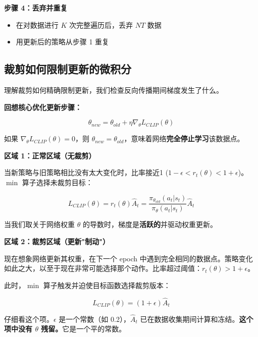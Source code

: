 \documentclass[12pt,a4paper]{article}
\theoremstyle{noteplain}
\theoremstyle{noteexercise}
\begin{document}
\textbf{步骤 4：丢弃并重复}
\begin{itemize}
  \setlength{\itemsep}{0.2em}
  \item 在对数据进行 $K$ 次完整遍历后，丢弃 $NT$ 数据
  \item 用更新后的策略从步骤 1 重复
\end{itemize}

\subsection{裁剪如何限制更新的微积分}

理解裁剪如何精确限制更新，我们检查反向传播期间梯度发生了什么。

\textbf{回想核心优化更新步骤：}

\begin{equation}\label{eq:update-step-2}
  \theta_{new} = \theta_{old} + \eta \nabla_\theta L_{CLIP}(\theta)
\end{equation}

如果 $\nabla_\theta L_{CLIP}(\theta) = 0$，则 $\theta_{new} = \theta_{old}$，意味着网络\textbf{完全停止学习}该数据点。

\textbf{区域 1：正常区域（无裁剪）}

当新策略与旧策略相比没有太大变化时，比率接近1 ($1-\epsilon < r_t(\theta) < 1+\epsilon$)。$\min$ 算子选择未裁剪目标：

\begin{equation}\label{eq:normal-zone}
  L_{CLIP}(\theta) = r_t(\theta) \hat{A}_t = \frac{\pi_{\theta_{old}}(a_t|s_t)}{\pi_\theta(a_t|s_t)} \hat{A}_t
\end{equation}

当我们取关于网络权重 $\theta$ 的导数时，梯度是\textbf{活跃的}并驱动权重更新。

\textbf{区域 2：裁剪区域（更新"制动"）}

现在想象网络更新其权重，在下一个 epoch 中遇到完全相同的数据点。策略变化如此之大，以至于现在非常可能选择那个动作。比率超过阈值：$r_t(\theta) > 1+\epsilon$。

此时，$\min$ 算子触发并迫使目标函数选择裁剪版本：

\begin{equation}\label{eq:clipped-zone}
  L_{CLIP}(\theta) = (1+\epsilon) \hat{A}_t
\end{equation}

仔细看这个项。$\epsilon$ 是一个常数（如 0.2），$\hat{A}_t$ 已在数据收集期间计算和冻结。\textbf{这个项中没有 $\theta$ 残留。}它是一个平的常数。
\end{document}
